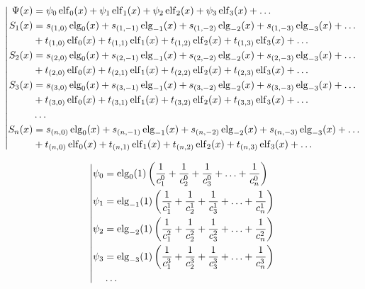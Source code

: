 \begin{equation*} \left| \begin{aligned}
\Psi(x) &=
  \psi_0 \elf_0(x)
+ \psi_1 \elf_1(x) 
+ \psi_2 \elf_2(x) 
+ \psi_3 \elf_3(x) 
+ \ldots \\
%
S_1(x) &=
  s_{(1,0)} \elg_0(x) 
+ s_{(1,-1)} \elg_{-1}(x)
+ s_{(1,-2)} \elg_{-2}(x)
+ s_{(1,-3)} \elg_{-3}(x)
+ \ldots \\ &
+ t_{(1,0)} \elf_0(x)
+ t_{(1,1)} \elf_1(x)
+ t_{(1,2)} \elf_2(x)
+ t_{(1,3)} \elf_3(x)
+ \ldots \\
%
S_2(x) &= 
  s_{(2,0)} \elg_0(x)
+ s_{(2,-1)} \elg_{-1}(x)
+ s_{(2,-2)} \elg_{-2}(x)
+ s_{(2,-3)} \elg_{-3}(x)
+ \ldots \\ &
+ t_{(2,0)} \elf_0(x)
+ t_{(2,1)} \elf_1(x)
+ t_{(2,2)} \elf_2(x)
+ t_{(2,3)} \elf_3(x)
+ \ldots \\
%
S_3(x) &= 
  s_{(3,0)} \elg_0(x)
+ s_{(3,-1)} \elg_{-1}(x)
+ s_{(3,-2)} \elg_{-2}(x)
+ s_{(3,-3)} \elg_{-3}(x)
+ \ldots \\ &
+ t_{(3,0)} \elf_0(x)
+ t_{(3,1)} \elf_1(x)
+ t_{(3,2)} \elf_2(x)
+ t_{(3,3)} \elf_3(x)
+ \ldots \\
%
&\ldots \\
%
S_n(x) &= 
  s_{(n,0)} \elg_0(x)
+ s_{(n,-1)} \elg_{-1}(x)
+ s_{(n,-2)} \elg_{-2}(x)
+ s_{(n,-3)} \elg_{-3}(x)
+ \ldots \\ &
+ t_{(n,0)} \elf_0(x)
+ t_{(n,1)} \elf_1(x)
+ t_{(n,2)} \elf_2(x)
+ t_{(n,3)} \elf_3(x)
+ \ldots \\
\end{aligned} \right. \end{equation*}

\begin{equation*} \left| \begin{aligned}
\psi_0 &= \elg_0(1) \left(
  \frac{1}{c_1^0}
+ \frac{1}{c_2^0}
+ \frac{1}{c_3^0}
+ \ldots
+ \frac{1}{c_n^0} \right) \\
%
\psi_1 &= \elg_{-1}(1) \left(
  \frac{1}{c_1^1}
+ \frac{1}{c_2^1}
+ \frac{1}{c_3^1}
+ \ldots
+ \frac{1}{c_n^1} \right) \\
%
\psi_2 &= \elg_{-2}(1) \left(
  \frac{1}{c_1^2}
+ \frac{1}{c_2^2}
+ \frac{1}{c_3^2}
+ \ldots
+ \frac{1}{c_n^2} \right) \\
%
\psi_3 &= \elg_{-3}(1) \left(
  \frac{1}{c_1^3}
+ \frac{1}{c_2^3}
+ \frac{1}{c_3^3}
+ \ldots
+ \frac{1}{c_n^3} \right) \\
%
&\ldots \\
\end{aligned} \right. \end{equation*}


